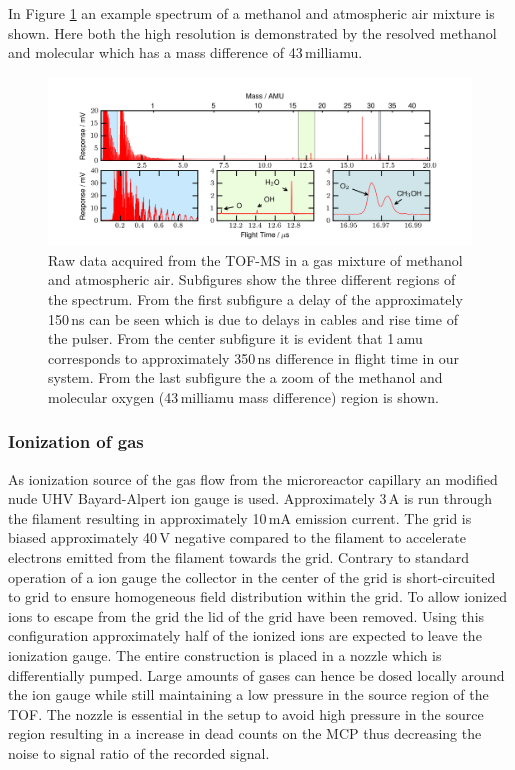 \documentclass[aip,rsi]{revtex4-1}
\begin{document}
In Figure \ref{fig:untreated_data} an example spectrum of a methanol and atmospheric air mixture is shown. Here both the high resolution is demonstrated by the resolved methanol and molecular which has a mass difference of 43\,milliamu.
\begin{figure}
 \includegraphics[width=16cm]{untreated_data.png}%
 \caption{Raw data acquired from the TOF-MS in a gas mixture of methanol and atmospheric air. Subfigures show the three different regions of the spectrum. From the first subfigure a delay of the approximately 150\,ns can be seen which is due to delays in cables and rise time of the pulser. From the center subfigure it is evident that 1\,amu corresponds to approximately 350\,ns difference in flight time in our system. From the last subfigure the a zoom of the methanol and molecular oxygen (43\,milliamu mass difference) region is shown.\label{fig:untreated_data}}%
\end{figure}


\subsubsection{Ionization of gas}
As ionization source of the gas flow from the microreactor capillary an modified nude UHV Bayard-Alpert ion gauge is used. Approximately 3\,A is run through the filament resulting in approximately 10\,mA emission current. The grid is biased approximately 40\,V negative compared to the filament to accelerate electrons emitted from the filament towards the grid. Contrary to standard operation of a ion gauge the collector in the center of the grid is short-circuited to grid to ensure homogeneous field distribution within the grid. To allow ionized ions to escape from the grid the lid of the grid have been removed. Using this configuration approximately half of the ionized ions are expected to leave the ionization gauge. The entire construction is placed in a nozzle which is differentially pumped. Large amounts of gases can hence be dosed locally around the ion gauge while still maintaining a low pressure in the source region of the TOF. The nozzle is essential in the setup to avoid high pressure in the source region resulting in a increase in dead counts on the MCP thus decreasing the noise to signal ratio of the recorded signal.
\end{document}
